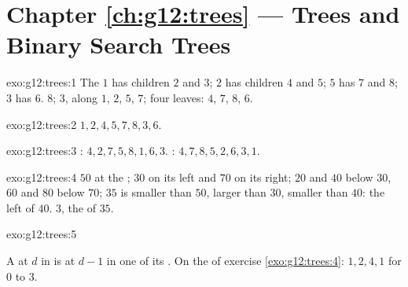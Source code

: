 \section*{Chapter \ref{ch:g12:trees} --- Trees and Binary Search Trees}

\begin{solution}{exo:g12:trees:1}
The  $1$ has children $2$ and $3$; $2$ has children $4$ and $5$; $5$ has $7$ and $8$; $3$ has $6$.  $8$;
 $3$, along $1$, $2$, $5$, $7$; four leaves: $4$, $7$, $8$, $6$.
\end{solution}

\begin{solution}{exo:g12:trees:2}
$1, 2, 4, 5, 7, 8, 3, 6$.
\end{solution}

\begin{solution}{exo:g12:trees:3}
: $4, 2, 7, 5, 8, 1, 6, 3$. : $4, 7, 8, 5, 2, 6, 3, 1$.
\end{solution}

\begin{solution}{exo:g12:trees:4}
$50$ at the ; $30$ on its left and $70$ on its right; $20$ and $40$ below $30$, $60$ and $80$ below $70$; $35$ is
smaller than $50$, larger than $30$, smaller than $40$: the left  of $40$.  $3$, the  of $35$.
\end{solution}

\begin{solution}{exo:g12:trees:5}
\smallskip\noindent\hspace*{2em}

\noindent\hspace*{4em}

\noindent\hspace*{6em}

\noindent\hspace*{4em}

\noindent\hspace*{6em}

\noindent\hspace*{4em}

\smallskip\noindent A  at  $d$ in  is at  $d - 1$ in one of its . On the  of
exercise \ref{exo:g12:trees:4}: $1, 2, 4, 1$ for  $0$ to $3$.
\end{solution}

